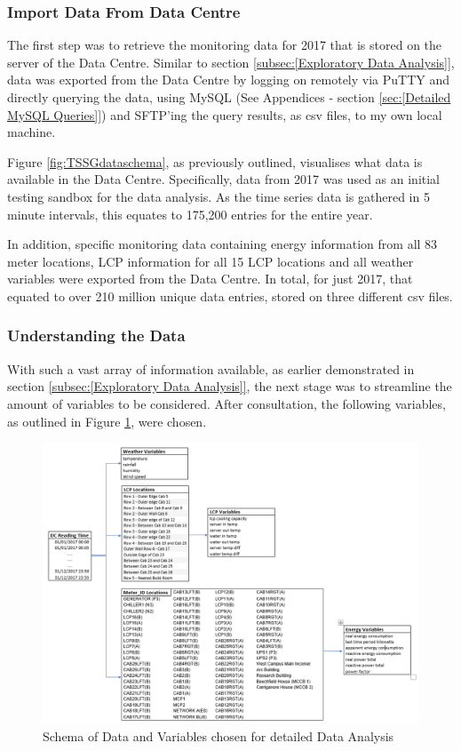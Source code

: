\documentclass[12pt]{scrartcl}
\begin{document}
\subsubsection{Import Data From Data Centre}
\label{subsubsec:[Import Data From Data Centre]}

The first step was to retrieve the monitoring data for 2017 that is stored on the server of the Data Centre. Similar to section \ref{subsec:[Exploratory Data Analysis]}, data was exported from the Data Centre by logging on remotely via PuTTY and directly querying the data, using MySQL (See Appendices - section \ref{sec:[Detailed MySQL Queries]}) and SFTP'ing the query results, as csv files, to my own local machine. 

Figure \ref{fig:TSSGdataschema}, as previously outlined, visualises what data is available in the Data Centre. Specifically, data from 2017 was used as an initial testing sandbox for the data analysis. As the time series data is gathered in 5 minute intervals, this equates to 175,200 entries for the entire year. 

In addition, specific monitoring data containing energy information from all 83 meter locations, \gls{LCP} information for all 15 \gls{LCP} locations and all weather variables were exported from the Data Centre. In total, for just 2017, that equated to over 210 million unique data entries, stored on three different csv files. 

\subsubsection{Understanding the Data}
\label{subsubsec:[Understanding the Data]}

With such a vast array of information available, as earlier demonstrated in section \ref{subsec:[Exploratory Data Analysis]}, the next stage was to streamline the amount of variables to be considered. After consultation, the following variables, as outlined in Figure \ref{fig:finalvariables}, were chosen.  

\begin{figure}[H]
  \caption{Schema of Data and Variables chosen for detailed Data Analysis}
  \label{fig:finalvariables}
  \centering
    \includegraphics[scale=0.40]{finalvariables}
\end{figure} 
\end{document}
